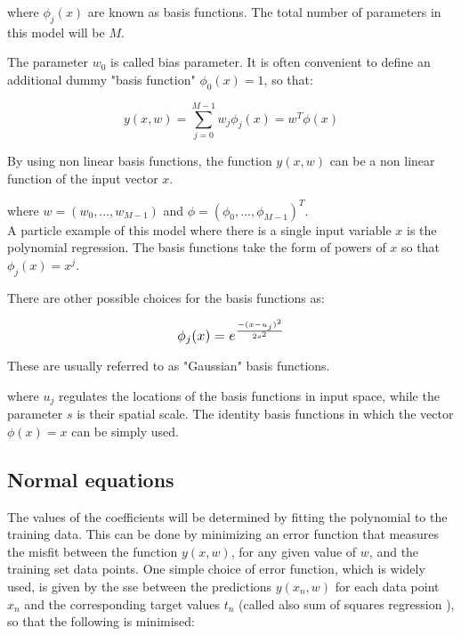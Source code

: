 \noindent where $\phi_j(x)$ are known as basis functions. The total number of parameters in this model will be $M$.

\noindent The parameter $w_0$ is called bias parameter. It is often convenient to define an additional dummy "basis function" $\phi_0(x)=1$, so that:

\begin{Equation}[H]
	\centering
	\begin{equation} \label{eq:vectlincomb}
		y(x,w)=\sum_{j=0}^{M-1}w_j \phi_j(x) = w^T\phi(x)
	\end{equation}
	\caption[Linear combinations of fixed nonlinear basis functions.]{By using non linear basis functions, the function $y(x,w)$ can be a non linear function of the input vector $x$.}
\end{Equation}

\noindent where $w=(w_0,...,w_{M-1})$ and $\phi=(\phi_0,...,\phi_{M-1})^T$. \\

\noindent A particle example of this model where there is a single input variable $x$ is the polynomial regression. The basis functions take the form of powers of $x$ so that $\phi_j(x)=x^j$.

\noindent There are other possible choices for the basis functions as:

\begin{Equation}[H]
	\centering
	\begin{equation} \label{eq:gausbasfun}
		\resizebox{.25\hsize}{!}{$ \phi_j(x)=e^{\frac{-(x-u_j)^2}{2s^2}} $}
	\end{equation}
	\caption[Gaussian basis function.]{These are usually referred to as "Gaussian" basis functions.}
\end{Equation}

\noindent where $u_j$ regulates the locations of the basis functions in input space, while the parameter $s$ is their spatial scale.
\noindent The identity basis functions in which the vector $\phi(x)=x$ can be simply used.

\subsection{Normal equations}
\label{subsec:reglinmulnormeq}
The values of the coefficients will be determined by fitting the polynomial to the training data. This can be done by minimizing an error function that measures the misfit between the function $y(x, w)$, for any given value of $w$, and the training set data points. One simple choice of error function, which is widely used, is given by the \gls{sse} between the predictions $y(x_n, w)$ for each data point $x_n$ and the corresponding target values $t_n$ (called also sum of squares regression \cite[]{sum-squares}), so that the following is minimised:

